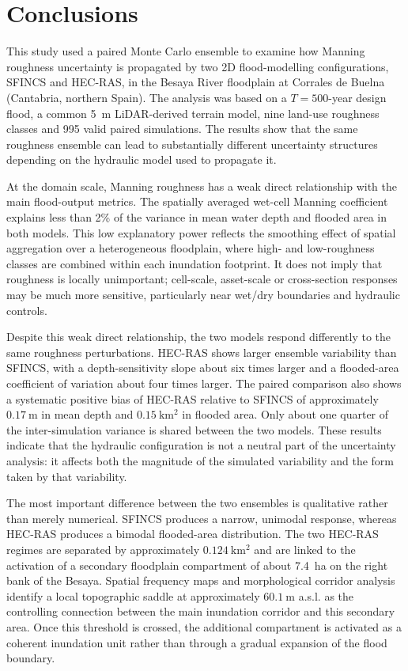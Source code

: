 \documentclass[a4paper,fleqn]{cas-sc}
\newcommand{\sfincs}{\textsc{SFINCS}}
\newcommand{\hecras}{\textsc{HEC-RAS}}
\begin{document}
\section{Conclusions}\label{sec:conclusions}
This study used a paired Monte Carlo ensemble to examine how Manning roughness uncertainty is propagated by two 2D flood-modelling configurations, \sfincs{} and \hecras{}, in the Besaya River floodplain at Corrales de Buelna (Cantabria, northern Spain). The analysis was based on a $T=500$-year design flood, a common 5~m LiDAR-derived terrain model, nine land-use roughness classes and \num{995} valid paired simulations. The results show that the same roughness ensemble can lead to substantially different uncertainty structures depending on the hydraulic model used to propagate it.

At the domain scale, Manning roughness has a weak direct relationship with the main flood-output metrics. The spatially averaged wet-cell Manning coefficient explains less than 2\% of the variance in mean water depth and flooded area in both models. This low explanatory power reflects the smoothing effect of spatial aggregation over a heterogeneous floodplain, where high- and low-roughness classes are combined within each inundation footprint. It does not imply that roughness is locally unimportant; cell-scale, asset-scale or cross-section responses may be much more sensitive, particularly near wet/dry boundaries and hydraulic controls.

Despite this weak direct relationship, the two models respond differently to the same roughness perturbations. \hecras{} shows larger ensemble variability than \sfincs{}, with a depth-sensitivity slope about six times larger and a flooded-area coefficient of variation about four times larger. The paired comparison also shows a systematic positive bias of \hecras{} relative to \sfincs{} of approximately $0.17~\mathrm{m}$ in mean depth and $0.15~\mathrm{km^2}$ in flooded area. Only about one quarter of the
inter-simulation variance is shared between the two models. These results indicate that the hydraulic configuration is not a neutral part of the uncertainty analysis: it affects both the magnitude of the simulated variability and the form taken by that variability.

The most important difference between the two ensembles is qualitative rather than merely numerical. \sfincs{} produces a narrow, unimodal response, whereas \hecras{} produces a bimodal flooded-area distribution. The two \hecras{} regimes are separated by approximately $0.124~\mathrm{km^2}$ and are linked to the activation of a secondary floodplain compartment of about 7.4~ha on the right bank of the Besaya. Spatial frequency maps and morphological corridor analysis identify a local topographic saddle at approximately $60.1~\mathrm{m}$ a.s.l. as the controlling connection between the main inundation corridor and this secondary area. Once this threshold is crossed, the additional compartment is activated as a coherent inundation unit rather than through a gradual expansion of the flood boundary.
\end{document}
